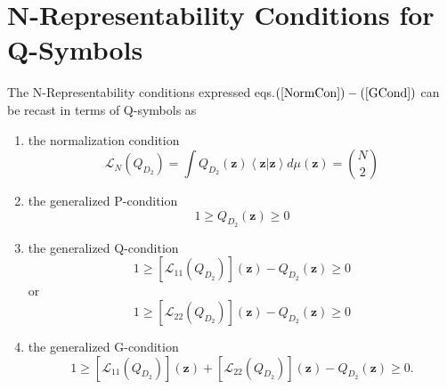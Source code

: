 \documentclass[aps,preprint]{revtex4}%
\begin{document}
\section{N-Representability Conditions for Q-Symbols}

The N-Representability conditions expressed eqs.$\left(  \ref{NormCon}\right)
-\left(  \ref{GCond}\right)  $ can be recast in terms of Q-symbols as

\begin{enumerate}
\item \bigskip the normalization condition
\begin{equation}
\mathcal{L}_{N}\left(  Q_{D_{2}}\right)  =\int Q_{D_{2}}\left(  \mathbf{z}%
\right)  \left\langle \mathbf{z\left\vert \mathbf{z}\right.  }\right\rangle
d\mu\left(  \mathbf{z}\right)  =\binom{N}{2} \label{QsymNorm}%
\end{equation}


\item the generalized P-condition%
\begin{equation}
1\geq Q_{D_{2}}\left(  \mathbf{z}\right)  \geq0 \label{QsymP}%
\end{equation}


\item the generalized Q-condition
\begin{equation}
1\geq\left[  \mathcal{L}_{11}\left(  Q_{D_{2}}\right)  \right]  \left(
\mathbf{z}\right)  -Q_{D_{2}}\left(  \mathbf{z}\right)  \geq0 \label{QsymQ1}%
\end{equation}
or%
\begin{equation}
1\geq\left[  \mathcal{L}_{22}\left(  Q_{D_{2}}\right)  \right]  \left(
\mathbf{z}\right)  -Q_{D_{2}}\left(  \mathbf{z}\right)  \geq0 \label{QsymQ2}%
\end{equation}


\item the generalized G-condition%
\begin{equation}
1\geq\left[  \mathcal{L}_{11}\left(  Q_{D_{2}}\right)  \right]  \left(
\mathbf{z}\right)  +\left[  \mathcal{L}_{22}\left(  Q_{D_{2}}\right)  \right]
\left(  \mathbf{z}\right)  -Q_{D_{2}}\left(  \mathbf{z}\right)  \geq0.
\label{QsymG}%
\end{equation}

\end{enumerate}
\end{document}
